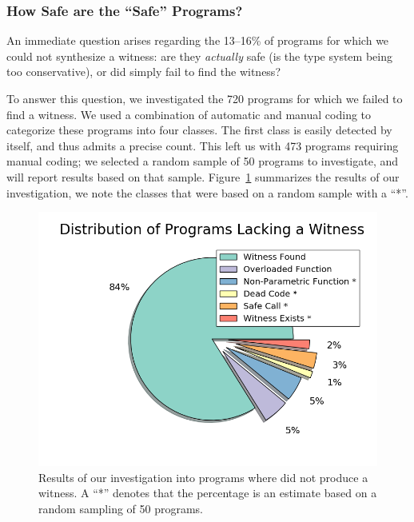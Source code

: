 \subsubsection{How Safe are the ``Safe'' Programs?}
\label{sec:how-safe}

An immediate question arises regarding the 13--16\% of programs for
which we could not synthesize a witness:
%
are they \emph{actually} safe (\ie is the type system being too conservative),
%
or did \toolname simply fail to find the witness?
%

To answer this question, we investigated the 720 \ucsdbench programs for
which we failed to find a witness.
%
We used a combination of automatic and manual coding to categorize these
programs into four classes.
%
The first class is easily detected by \toolname itself, and thus admits
a precise count.
%
This left us with 473 programs requiring manual coding; we selected
a random sample of 50 programs to investigate, and will report results
based on that sample.
%
Figure~\ref{fig:no-witness} summarizes the results of our investigation,
we note the classes that were based on a random sample with a ``*''.


\begin{figure}[t]
\includegraphics[width=0.8\linewidth]{distrib_ext.png}
\vspace{-0.75cm}
\caption{Results of our investigation into programs where \toolname
  did not produce a witness. A ``*'' denotes that the percentage is an
  estimate based on a random sampling of 50 programs.}
\label{fig:no-witness}
\end{figure}

